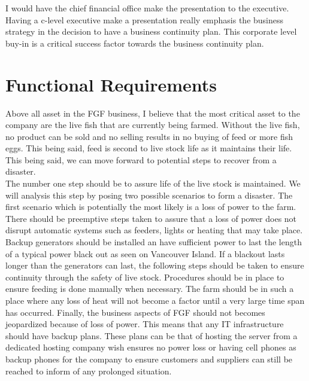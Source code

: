 \documentclass[paper=a4, fontsize=11pt]{scrartcl} %
\numberwithin{equation}{section} %
\numberwithin{figure}{section} %
\numberwithin{table}{section} %
\begin{document}
I would have the chief financial office make the presentation to the executive. Having
a c-level executive make a presentation really emphasis the business strategy in the
decision to have a business continuity plan. This corporate level buy-in is a critical
success factor towards the business continuity plan.



\section{Functional Requirements}

Above all asset in the FGF business, I believe that the most critical asset to the company
are the live fish that are currently being farmed. Without the live fish, no product can be
sold and no selling results in no buying of feed or more fish eggs. This being said, feed is
second to live stock life as it maintains their life. This being said, we can move forward to
potential steps to recover from a disaster.\\

The number one step should be to assure life of the live stock is maintained. We will analysis
this step by posing two possible scenarios to form a disaster. The first scenario which is
potentially the most likely is a loss of power to the farm. There should be preemptive steps
taken to assure that a loss of power does not disrupt automatic systems such as feeders, lights
or heating that may take place. Backup generators should be installed an have sufficient power
to last the length of a typical power black out as seen on Vancouver Island. If a blackout lasts
longer than the generators can last, the following steps should be taken to ensure continuity
through the safety of live stock. Procedures should be in place to ensure feeding is done manually
when necessary. The farm should be in such a place where any loss of heat will not become a factor
until a very large time span has occurred. Finally, the business aspects of FGF should not becomes
jeopardized because of loss of power. This means that any IT infrastructure should have backup
plans. These plans can be that of hosting the server from a dedicated hosting company wish ensures
no power loss or having cell phones as backup phones for the company to ensure customers and suppliers
can still be reached to inform of any prolonged situation.\\
\end{document}
